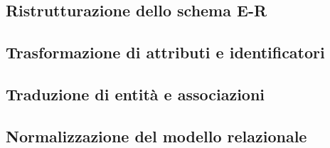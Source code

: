 \subsection*{Ristrutturazione dello schema E-R}
%
%
\subsection*{Trasformazione di attributi e identificatori}
%
%
\subsection*{Traduzione di entità e associazioni}
%
%
\subsection*{Normalizzazione del modello relazionale}
%
%
